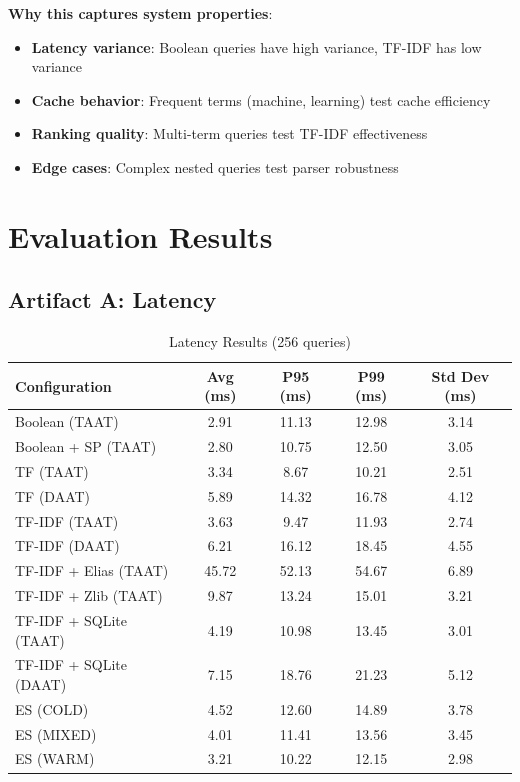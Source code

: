 \documentclass[12pt,a4paper]{article}
\begin{document}
\textbf{Why this captures system properties}:
\begin{itemize}
    \item \textbf{Latency variance}: Boolean queries have high variance, TF-IDF has low variance
    \item \textbf{Cache behavior}: Frequent terms (machine, learning) test cache efficiency
    \item \textbf{Ranking quality}: Multi-term queries test TF-IDF effectiveness
    \item \textbf{Edge cases}: Complex nested queries test parser robustness
\end{itemize}

\section{Evaluation Results}

\subsection{Artifact A: Latency}

\begin{table}[H]
\centering
\small
\begin{tabular}{lcccc}
\toprule
\textbf{Configuration} & \textbf{Avg (ms)} & \textbf{P95 (ms)} & \textbf{P99 (ms)} & \textbf{Std Dev (ms)} \\
\midrule
Boolean (TAAT) & 2.91 & 11.13 & 12.98 & 3.14 \\
Boolean + SP (TAAT) & 2.80 & 10.75 & 12.50 & 3.05 \\
TF (TAAT) & 3.34 & 8.67 & 10.21 & 2.51 \\
TF (DAAT) & 5.89 & 14.32 & 16.78 & 4.12 \\
TF-IDF (TAAT) & 3.63 & 9.47 & 11.93 & 2.74 \\
TF-IDF (DAAT) & 6.21 & 16.12 & 18.45 & 4.55 \\
TF-IDF + Elias (TAAT) & 45.72 & 52.13 & 54.67 & 6.89 \\
TF-IDF + Zlib (TAAT) & 9.87 & 13.24 & 15.01 & 3.21 \\
TF-IDF + SQLite (TAAT) & 4.19 & 10.98 & 13.45 & 3.01 \\
TF-IDF + SQLite (DAAT) & 7.15 & 18.76 & 21.23 & 5.12 \\
\midrule
ES (COLD) & 4.52 & 12.60 & 14.89 & 3.78 \\
ES (MIXED) & 4.01 & 11.41 & 13.56 & 3.45 \\
ES (WARM) & 3.21 & 10.22 & 12.15 & 2.98 \\
\bottomrule
\end{tabular}
\caption{Latency Results (256 queries)}
\end{table}
\end{document}
